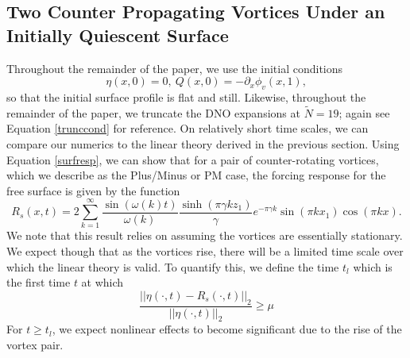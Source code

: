 \documentclass[a4paper,11pt]{article}
\newcommand{\p}{\partial}
\newcommand{\gnorm}[1]{\left|\left| #1\right|\right|}
\begin{document}

\subsection{Two Counter Propagating Vortices Under an Initially Quiescent Surface}
Throughout the remainder of the paper, we use the initial conditions
\[
\eta(x,0) = 0, ~ Q(x,0) = -\p_{x}\phi_{v}(x,1),
\]
so that the initial surface profile is flat and still.  Likewise, throughout the remainder of the paper, we truncate the DNO expansions at $\tilde{N}=19$; again see Equation \eqref{trunccond} for reference.  On relatively short time scales, we can compare our numerics to the linear theory derived in the previous section.  Using Equation \eqref{surfresp}, we can show that for a pair of counter-rotating vortices, which we describe as the Plus/Minus or PM case, the forcing response for the free surface is given by the function
\begin{equation}
R_{s}(x,t) = 2\sum_{k=1}^{\infty} \frac{\sin(\omega(k)t)}{\omega(k)}\frac{\sinh(\pi \gamma k z_{1})}{\gamma}e^{-\pi \gamma k}\sin(\pi k x_{1})\cos(\pi k x).
\label{twovortsurfresp}
\end{equation}
We note that this result relies on assuming the vortices are essentially stationary.  We expect though that as the vortices rise, there will be a limited time scale over which the linear theory is valid.  To quantify this, we define the time $t_{l}$ which is the first time $t$ at which 
\[
\frac{\gnorm{\eta(\cdot,t)-R_{s}(\cdot,t)}_{2}}{\gnorm{\eta(\cdot,t)}_{2}}\geq \mu
\]    
For $t\geq t_{l}$, we expect nonlinear effects to become significant due to the rise of the vortex pair.    
\end{document}
